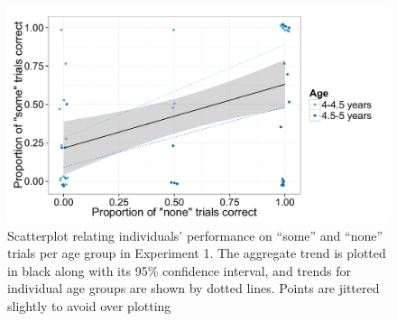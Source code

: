 \documentclass[man]{apa2}
\begin{document}
 \begin{figure}[!h]
 	\centering
           \begin{floatrow}
           \end{floatrow}
\end{figure}	


\begin{figure} 
 \begin{center} 
  \includegraphics[scale=.55]{figures/exp1_diffs.pdf} 
  \caption{\label{fig:exp1_diffs} Scatterplot relating individuals' performance on ``some'' and ``none'' trials per age group in Experiment 1. The aggregate trend is plotted in black along with its 95\% confidence interval, and trends for individual age groups are shown by dotted lines. Points are jittered slightly to avoid over plotting} 
 \end{center} 
\end{figure}
\end{document}
